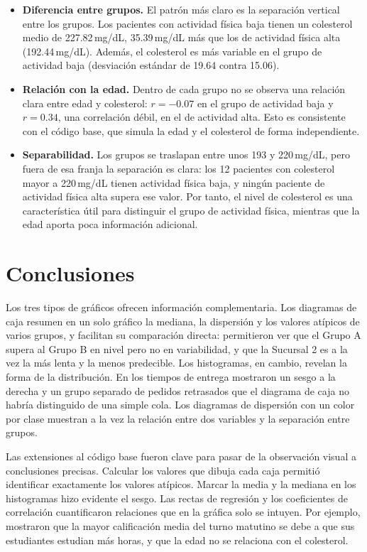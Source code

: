 \documentclass[11pt,letterpaper]{article}
\begin{document}
\begin{itemize}
    \item \textbf{Diferencia entre grupos.} El patrón más claro es la separación vertical entre los grupos. Los pacientes con actividad física baja tienen un colesterol medio de 227.82\,mg/dL, 35.39\,mg/dL más que los de actividad física alta (192.44\,mg/dL). Además, el colesterol es más variable en el grupo de actividad baja (desviación estándar de 19.64 contra 15.06).
    \item \textbf{Relación con la edad.} Dentro de cada grupo no se observa una relación clara entre edad y colesterol: $r = -0.07$ en el grupo de actividad baja y $r = 0.34$, una correlación débil, en el de actividad alta. Esto es consistente con el código base, que simula la edad y el colesterol de forma independiente.
    \item \textbf{Separabilidad.} Los grupos se traslapan entre unos 193 y 220\,mg/dL, pero fuera de esa franja la separación es clara: los 12 pacientes con colesterol mayor a 220\,mg/dL tienen actividad física baja, y ningún paciente de actividad física alta supera ese valor. Por tanto, el nivel de colesterol es una característica útil para distinguir el grupo de actividad física, mientras que la edad aporta poca información adicional.
\end{itemize}

\section{Conclusiones}

Los tres tipos de gráficos ofrecen información complementaria. Los diagramas de caja resumen en un solo gráfico la mediana, la dispersión y los valores atípicos de varios grupos, y facilitan su comparación directa: permitieron ver que el Grupo A supera al Grupo B en nivel pero no en variabilidad, y que la Sucursal 2 es a la vez la más lenta y la menos predecible. Los histogramas, en cambio, revelan la forma de la distribución. En los tiempos de entrega mostraron un sesgo a la derecha y un grupo separado de pedidos retrasados que el diagrama de caja no habría distinguido de una simple cola. Los diagramas de dispersión con un color por clase muestran a la vez la relación entre dos variables y la separación entre grupos.

Las extensiones al código base fueron clave para pasar de la observación visual a conclusiones precisas. Calcular los valores que dibuja cada caja permitió identificar exactamente los valores atípicos. Marcar la media y la mediana en los histogramas hizo evidente el sesgo. Las rectas de regresión y los coeficientes de correlación cuantificaron relaciones que en la gráfica solo se intuyen. Por ejemplo, mostraron que la mayor calificación media del turno matutino se debe a que sus estudiantes estudian más horas, y que la edad no se relaciona con el colesterol.
\end{document}
